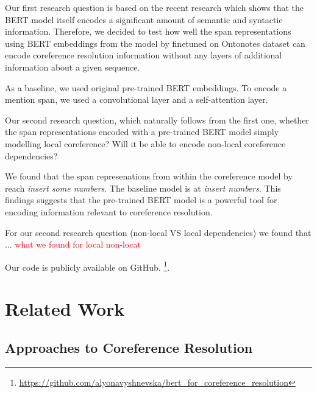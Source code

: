 \documentclass[11pt]{article}
\newcommand\todo[1]{\textcolor{red}{#1}}
\begin{document}
Our first research question is based on the recent research which shows that the BERT model itself encodes a significant amount of semantic and syntactic information. Therefore, we decided to test how well the span representations using BERT embeddings from the model by \textcite{joshi2019coref} finetuned on Ontonotes dataset \parencite{conll}  can encode coreference resolution information without any layers of additional information about a given sequence. 

As a baseline, we used original pre-trained BERT embeddings. To encode a mention span,  we used a convolutional layer and a  self-attention layer.

Our second research question, which naturally follows from the first one, whether the span representations encoded with a pre-trained BERT model simply modelling local coreference? Will it be able to encode non-local coreference dependencies? 

We found that the span represenations from within the coreference model by \textcite{joshi2019coref} reach \textit{insert some numbers}. The baseline model is at \textit{insert numbers}. This findings suggests that the pre-trained BERT model is a powerful tool for encoding information relevant to coreference resolution. 

For our second research question (non-local VS local dependencies) we found that ... \todo{what we found for local non-locat}

Our code is publicly available on GitHub.  \footnote{\url{https://github.com/alyonavyshnevska/bert_for_coreference_resolution}}.


\section{Related Work}

\subsection{Approaches to Coreference Resolution}

\end{document}
